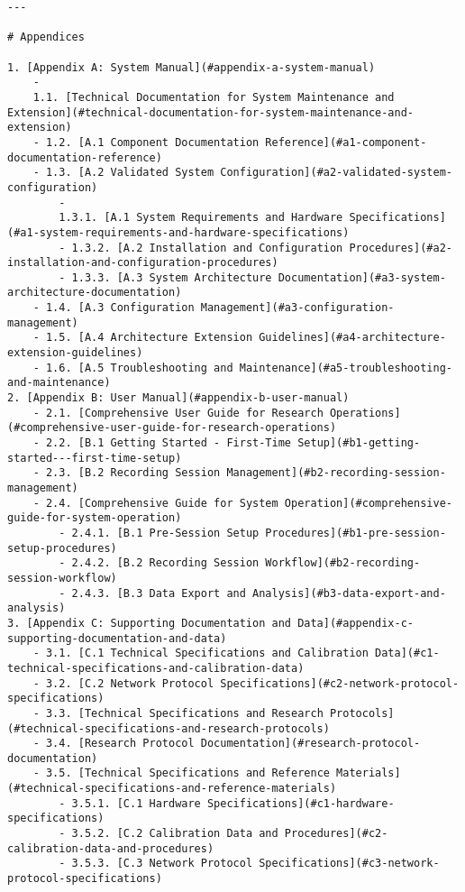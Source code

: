 \documentclass[12pt,a4paper]{report}
\begin{document}
\begin{verbatim}
---

# Appendices

1. [Appendix A: System Manual](#appendix-a-system-manual)
    -
    1.1. [Technical Documentation for System Maintenance and Extension](#technical-documentation-for-system-maintenance-and-extension)
    - 1.2. [A.1 Component Documentation Reference](#a1-component-documentation-reference)
    - 1.3. [A.2 Validated System Configuration](#a2-validated-system-configuration)
        -
        1.3.1. [A.1 System Requirements and Hardware Specifications](#a1-system-requirements-and-hardware-specifications)
        - 1.3.2. [A.2 Installation and Configuration Procedures](#a2-installation-and-configuration-procedures)
        - 1.3.3. [A.3 System Architecture Documentation](#a3-system-architecture-documentation)
    - 1.4. [A.3 Configuration Management](#a3-configuration-management)
    - 1.5. [A.4 Architecture Extension Guidelines](#a4-architecture-extension-guidelines)
    - 1.6. [A.5 Troubleshooting and Maintenance](#a5-troubleshooting-and-maintenance)
2. [Appendix B: User Manual](#appendix-b-user-manual)
    - 2.1. [Comprehensive User Guide for Research Operations](#comprehensive-user-guide-for-research-operations)
    - 2.2. [B.1 Getting Started - First-Time Setup](#b1-getting-started---first-time-setup)
    - 2.3. [B.2 Recording Session Management](#b2-recording-session-management)
    - 2.4. [Comprehensive Guide for System Operation](#comprehensive-guide-for-system-operation)
        - 2.4.1. [B.1 Pre-Session Setup Procedures](#b1-pre-session-setup-procedures)
        - 2.4.2. [B.2 Recording Session Workflow](#b2-recording-session-workflow)
        - 2.4.3. [B.3 Data Export and Analysis](#b3-data-export-and-analysis)
3. [Appendix C: Supporting Documentation and Data](#appendix-c-supporting-documentation-and-data)
    - 3.1. [C.1 Technical Specifications and Calibration Data](#c1-technical-specifications-and-calibration-data)
    - 3.2. [C.2 Network Protocol Specifications](#c2-network-protocol-specifications)
    - 3.3. [Technical Specifications and Research Protocols](#technical-specifications-and-research-protocols)
    - 3.4. [Research Protocol Documentation](#research-protocol-documentation)
    - 3.5. [Technical Specifications and Reference Materials](#technical-specifications-and-reference-materials)
        - 3.5.1. [C.1 Hardware Specifications](#c1-hardware-specifications)
        - 3.5.2. [C.2 Calibration Data and Procedures](#c2-calibration-data-and-procedures)
        - 3.5.3. [C.3 Network Protocol Specifications](#c3-network-protocol-specifications)

\end{verbatim}
\end{document}
